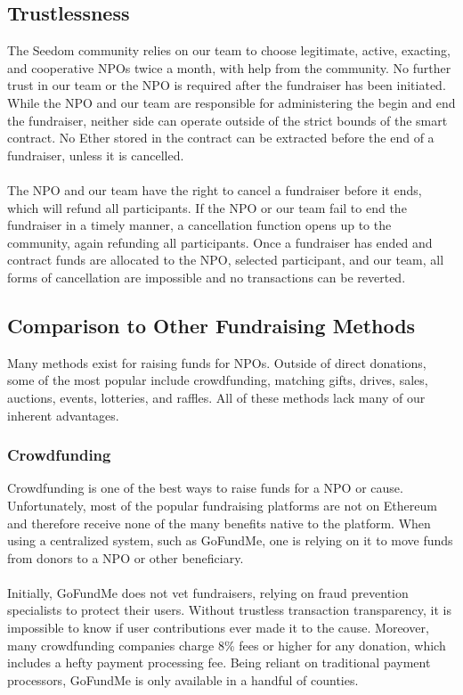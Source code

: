 \documentclass[11pt]{article}
\begin{document}
\subsection{Trustlessness}

The Seedom community relies on our team to choose legitimate, active, exacting, and cooperative NPOs twice a month, with help from the community. No further trust in our team or the NPO is required after the fundraiser has been initiated. While the NPO and our team are responsible for administering the begin and end the fundraiser, neither side can operate outside of the strict bounds of the smart contract. No Ether stored in the contract can be extracted before the end of a fundraiser, unless it is cancelled.\\\\
The NPO and our team have the right to cancel a fundraiser before it ends, which will refund all participants. If the NPO or our team fail to end the fundraiser in a timely manner, a cancellation function opens up to the community, again refunding all participants. Once a fundraiser has ended and contract funds are allocated to the NPO, selected participant, and our team, all forms of cancellation are impossible and no transactions can be reverted.

\subsection{Comparison to Other Fundraising Methods}

Many methods exist for raising funds for NPOs. Outside of direct donations, some of the most popular include crowdfunding, matching gifts, drives, sales, auctions, events, lotteries, and raffles. All of these methods lack many of our inherent advantages.

\subsubsection{Crowdfunding}

Crowdfunding is one of the best ways to raise funds for a NPO or cause. Unfortunately, most of the popular fundraising platforms are not on Ethereum and therefore receive none of the many benefits native to the platform. When using a centralized system, such as GoFundMe, one is relying on it to move funds from donors to a NPO or other beneficiary.\\\\
Initially, GoFundMe does not vet fundraisers, relying on fraud prevention specialists to protect their users. Without trustless transaction transparency, it is impossible to know if user contributions ever made it to the cause. Moreover, many crowdfunding companies charge 8\% fees or higher for any donation, which includes a hefty payment processing fee. Being reliant on traditional payment processors, GoFundMe is only available in a handful of counties.
\end{document}

